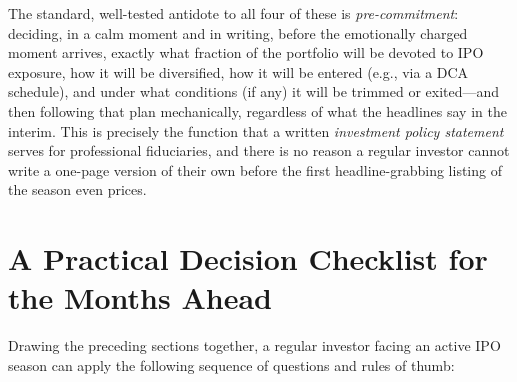 \documentclass[conference]{IEEEtran}
\begin{document}
The standard, well-tested antidote to all four of these is \emph{pre-commitment}: deciding, in a calm moment and in writing, before the emotionally charged moment arrives, exactly what fraction of the portfolio will be devoted to IPO exposure, how it will be diversified, how it will be entered (e.g., via a DCA schedule), and under what conditions (if any) it will be trimmed or exited---and then following that plan mechanically, regardless of what the headlines say in the interim. This is precisely the function that a written \emph{investment policy statement} serves for professional fiduciaries, and there is no reason a regular investor cannot write a one-page version of their own before the first headline-grabbing listing of the season even prices.

\section{A Practical Decision Checklist for the Months Ahead}
\label{sec:checklist}

Drawing the preceding sections together, a regular investor facing an active IPO season can apply the following sequence of questions and rules of thumb:
\end{document}
